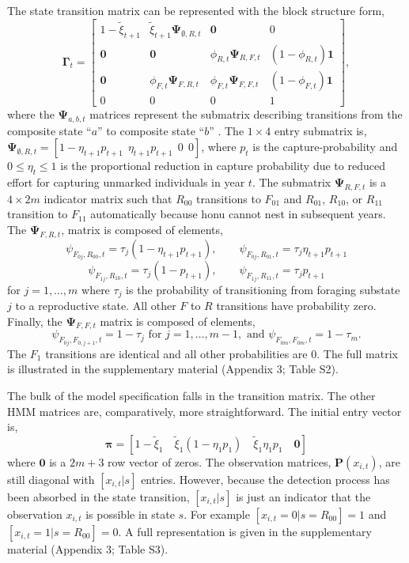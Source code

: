 \documentclass[11pt]{article}
\newcommand{\bP}{\ensuremath{\mathbf{P}}}
\newcommand{\bpi}{\ensuremath{\boldsymbol{\pi}}}
\newcommand{\bG}{\ensuremath{\boldsymbol{\Gamma}}}
\begin{document}
The state transition matrix can be represented with the block structure form,
\[
\bG_t = \left[\begin{array}{cccc}
1-\tilde{\xi}_{t+1} & \tilde{\xi}_{t+1}\boldsymbol{\Psi}_{\emptyset,R,t} & \mathbf{0} & 0\\
\mathbf{0} & \mathbf{0} & \phi_{R,t}\boldsymbol{\Psi}_{R,F,t}  & (1-\phi_{R,t})\mathbf{1} \\
\mathbf{0} & \phi_{F,t}\boldsymbol{\Psi}_{F,R,t} &  \phi_{F,t}\boldsymbol{\Psi}_{F,F,t} & (1-\phi_{F,t})\mathbf{1} \\
0 & 0 & 0 & 1
\end{array}
\right],
\] 
where the $\boldsymbol{\Psi}_{a,b,t}$ matrices represent the submatrix describing transitions from the composite state ``$a$'' to composite state ``$b$'' \citep{langrock2011hidden,king2016semi}. The $1\times 4$ entry submatrix is, $\boldsymbol{\Psi}_{\emptyset,R,t} = [1-\eta_{t+1} p_{t+1}\ \ \eta_{t+1} p_{t+1}\ \ 0\ \ 0]$, where $p_t$ is the capture-probability and $0 \le \eta_t \le 1$ is the proportional reduction in capture probability due to reduced effort for capturing unmarked individuals in year $t$. The submatrix $\boldsymbol{\Psi}_{R,F,t}$ is a $4 \times 2m$ indicator matrix such that $R_{00}$ transitions to $F_{01}$ and $R_{01}$, $R_{10}$, or $R_{11}$ transition to $F_{11}$ automatically because honu cannot nest in subsequent years. The $\boldsymbol{\Psi}_{F,R,t}$, matrix is composed of elements,
\[
\psi_{F_{0j},R_{00},t} = \tau_{j}(1-\eta_{t+1}p_{t+1}),\qquad \psi_{F_{0j},R_{01},t} = \tau_j\eta_{t+1} p_{t+1} 
\]
\[
\psi_{F_{1j},R_{10},t} = \tau_j(1-p_{t+1}),\qquad \psi_{F_{1j},R_{11},t} = \tau_j p_{t+1} 
\]
for $j=1,\dots,m$ where $\tau_j$ is the probability of transitioning from foraging substate $j$ to a reproductive state. All other $F$ to $R$ transitions have probability zero. Finally, the $\boldsymbol{\Psi}_{F,F,t}$ matrix is composed of elements,
\[
\psi_{F_{0j},F_{0,j+1},t} = 1-\tau_j \text{ for } j=1,\dots,m-1, \text{ and } \psi_{F_{0m},F_{0m},t} = 1-\tau_{m}.
\]
The $F_1$ transitions are identical and all other probabilities are 0. The full matrix is illustrated in the supplementary material (Appendix 3; Table S2). 

The bulk of the model specification falls in the transition matrix. The other HMM matrices are, comparatively, more straightforward. The initial entry vector is,
\[
\bpi = \left[1-\tilde{\xi}_1\quad \tilde{\xi}_1(1-\eta_1 p_1) \quad \tilde{\xi}_1\eta_1 p_1\quad \mathbf{0}\right]
\]
where $\mathbf{0}$ is a $2m+3$ row vector of zeros. The observation matrices, $\bP(x_{i,t})$, are still diagonal with $[x_{i,t}|s]$ entries. However, because the detection process has been absorbed in the state transition, $[x_{i,t}|s]$ is just an indicator that the observation $x_{i,t}$ is possible in state $s$. For example $[x_{i,t}=0|s=R_{00}]=1$ and $[x_{i,t}=1|s=R_{00}]=0$. A full representation is given in the supplementary material (Appendix 3; Table S3). 
\end{document}
